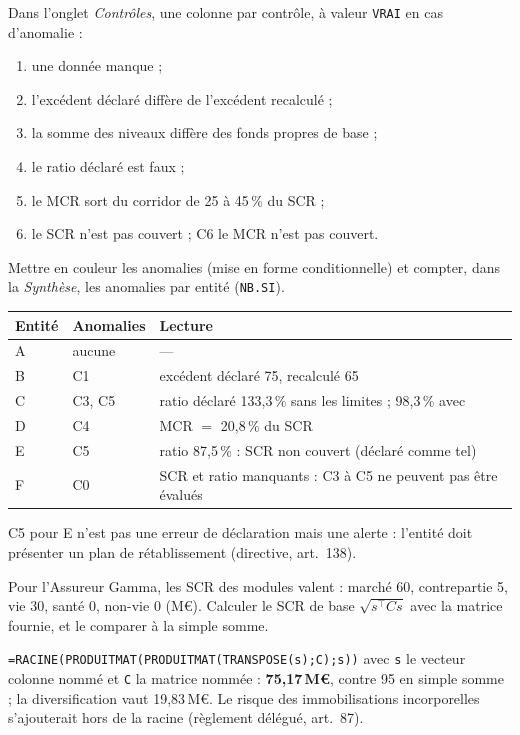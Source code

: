 \documentclass[11pt,a4paper]{article}
\newcommand{\meur}{\,M\euro}
\newcommand{\fx}[1]{\texttt{\small #1}}
\begin{document}
\begin{exercice}[Contrôler]
Dans l'onglet \emph{Contrôles}, une colonne par contrôle, à valeur \fx{VRAI} en cas d'anomalie :
\begin{enumerate}[nosep]
  \item[C0] une donnée manque ;
  \item[C1] l'excédent déclaré diffère de l'excédent recalculé ;
  \item[C2] la somme des niveaux diffère des fonds propres de base ;
  \item[C3] le ratio déclaré est faux ;
  \item[C4] le MCR sort du corridor de 25 à 45\,\% du SCR ;
  \item[C5] le SCR n'est pas couvert ; C6 le MCR n'est pas couvert.
\end{enumerate}
Mettre en couleur les anomalies (mise en forme conditionnelle) et compter, dans la \emph{Synthèse},
les anomalies par entité (\fx{NB.SI}).
\end{exercice}
\begin{corrige}
\begin{center}
\small
\begin{tabular}{lll}
\toprule
Entité & Anomalies & Lecture \\
\midrule
A & aucune & --- \\
B & C1 & excédent déclaré 75, recalculé 65 \\
C & C3, C5 & ratio déclaré 133,3\,\% sans les limites ; 98,3\,\% avec \\
D & C4 & MCR $=$ 20,8\,\% du SCR \\
E & C5 & ratio 87,5\,\% : SCR non couvert (déclaré comme tel) \\
F & C0 & SCR et ratio manquants : C3 à C5 ne peuvent pas être évalués \\
\bottomrule
\end{tabular}
\end{center}
C5 pour E n'est pas une erreur de déclaration mais une alerte : l'entité doit présenter un plan
de rétablissement (directive, art.~138).
\end{corrige}

\begin{exercice}
Pour l'Assureur Gamma, les SCR des modules valent : marché 60, contrepartie 5, vie 30, santé 0,
non-vie 0 (M\euro). Calculer le SCR de base $\sqrt{s^\top C s}$ avec la matrice fournie, et le
comparer à la simple somme.
\end{exercice}
\begin{corrige}
\fx{=RACINE(PRODUITMAT(PRODUITMAT(TRANSPOSE(s);C);s))} avec \fx{s} le vecteur colonne nommé et
\fx{C} la matrice nommée : \textbf{75,17\meur}, contre 95 en simple somme ; la diversification vaut
19,83\meur. Le risque des immobilisations incorporelles s'ajouterait hors de la racine
(règlement délégué, art.~87).
\end{corrige}
\end{document}
